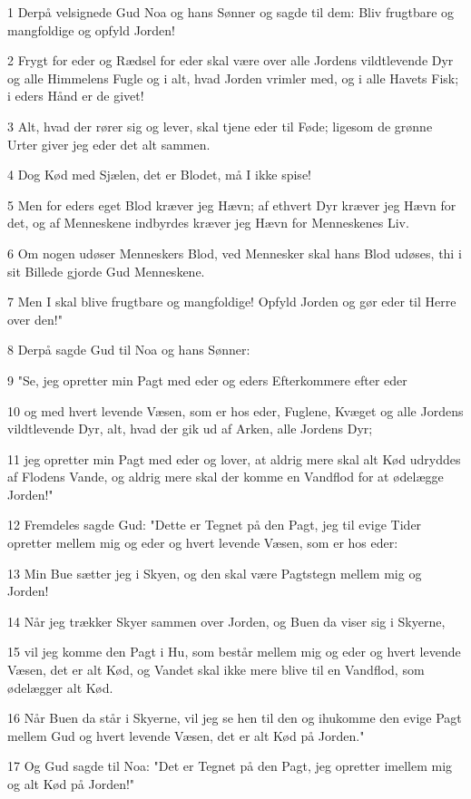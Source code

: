 \par 1 Derpå velsignede Gud Noa og hans Sønner og sagde til dem: Bliv frugtbare og mangfoldige og opfyld Jorden!
\par 2 Frygt for eder og Rædsel for eder skal være over alle Jordens vildtlevende Dyr og alle Himmelens Fugle og i alt, hvad Jorden vrimler med, og i alle Havets Fisk; i eders Hånd er de givet!
\par 3 Alt, hvad der rører sig og lever, skal tjene eder til Føde; ligesom de grønne Urter giver jeg eder det alt sammen.
\par 4 Dog Kød med Sjælen, det er Blodet, må I ikke spise!
\par 5 Men for eders eget Blod kræver jeg Hævn; af ethvert Dyr kræver jeg Hævn for det, og af Menneskene indbyrdes kræver jeg Hævn for Menneskenes Liv.
\par 6 Om nogen udøser Menneskers Blod, ved Mennesker skal hans Blod udøses, thi i sit Billede gjorde Gud Menneskene.
\par 7 Men I skal blive frugtbare og mangfoldige! Opfyld Jorden og gør eder til Herre over den!"
\par 8 Derpå sagde Gud til Noa og hans Sønner:
\par 9 "Se, jeg opretter min Pagt med eder og eders Efterkommere efter eder
\par 10 og med hvert levende Væsen, som er hos eder, Fuglene, Kvæget og alle Jordens vildtlevende Dyr, alt, hvad der gik ud af Arken, alle Jordens Dyr;
\par 11 jeg opretter min Pagt med eder og lover, at aldrig mere skal alt Kød udryddes af Flodens Vande, og aldrig mere skal der komme en Vandflod for at ødelægge Jorden!"
\par 12 Fremdeles sagde Gud: "Dette er Tegnet på den Pagt, jeg til evige Tider opretter mellem mig og eder og hvert levende Væsen, som er hos eder:
\par 13 Min Bue sætter jeg i Skyen, og den skal være Pagtstegn mellem mig og Jorden!
\par 14 Når jeg trækker Skyer sammen over Jorden, og Buen da viser sig i Skyerne,
\par 15 vil jeg komme den Pagt i Hu, som består mellem mig og eder og hvert levende Væsen, det er alt Kød, og Vandet skal ikke mere blive til en Vandflod, som ødelægger alt Kød.
\par 16 Når Buen da står i Skyerne, vil jeg se hen til den og ihukomme den evige Pagt mellem Gud og hvert levende Væsen, det er alt Kød på Jorden."
\par 17 Og Gud sagde til Noa: "Det er Tegnet på den Pagt, jeg opretter imellem mig og alt Kød på Jorden!"
